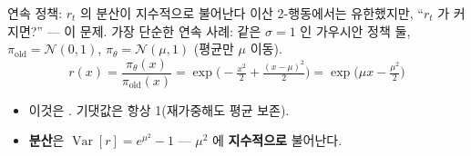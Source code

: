\begin{frame}{연속 정책: $r_t$ 의 분산이 지수적으로 불어난다}
  이산 2-행동에서는 유한했지만, ``$r_t$ 가 커지면?'' —
  이 문제. 가장 단순한 연속 사례:
  같은 $\sigma=1$ 인 가우시안 정책 둘,
  $\pi_{\mathrm{old}}=\mathcal{N}(0,1)$,
  $\pi_\theta=\mathcal{N}(\mu,1)$ (평균만 $\mu$ 이동).
  \small
  \[
  r(x) = \frac{\pi_\theta(x)}{\pi_{\mathrm{old}}(x)}
  = \exp\Big(-\tfrac{x^2}{2}+\tfrac{(x-\mu)^2}{2}\Big)
  = \exp\Big(\mu x - \tfrac{\mu^2}{2}\Big)
  \]
  \begin{itemize}
    \item 이것은 . 기댓값은 항상 1(재가중해도
      평균 보존).
    \item \textbf{분산}은 $\operatorname{Var}[r]=e^{\mu^2}-1$ —
      $\mu^2$ 에 \textbf{지수적으로} 불어난다.
  \end{itemize}
\end{frame}
